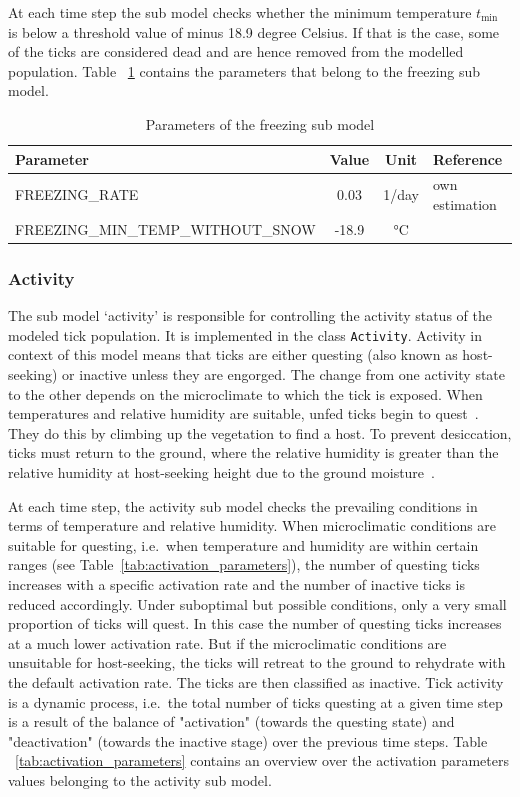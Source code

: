 \documentclass[a4paper, 11pt]{scrartcl}
\newcommand{\inlinecode}[1]{\texttt{\small #1}}
\begin{document}
At each time step the sub model checks whether the minimum temperature $t_{\min}$ is below a threshold value of minus 18.9 degree Celsius. If that is the case, some of the ticks are considered dead and are hence removed from the modelled population. Table ~\ref{tab:freezing_parameters} contains the parameters that belong to the freezing sub model.

\begin{table}[h!]
\caption{Parameters of the freezing sub model}
\label{tab:freezing_parameters}
\begin{tabularx}{\textwidth}{lccl}
\toprule
\textbf{Parameter}								& \textbf{Value} & \textbf{Unit}	& \textbf{Reference}  		\\
\midrule
\small{FREEZING\_RATE}		    			 	&   0.03    	& 1/day & own estimation 	\\
\small{FREEZING\_MIN\_TEMP\_WITHOUT\_SNOW}	   	&   -18.9    	& °C &  ~\cite{Gray.2009}	\\
\bottomrule
\end{tabularx}
\end{table}

\subsubsection{Activity}
The sub model `activity' is responsible for controlling the activity status of the modeled tick population. It is implemented in the class \inlinecode{Activity}. Activity in context of this model means that ticks are either questing (also known as host-seeking) or inactive unless they are engorged. The change from one activity state to the other depends on the microclimate to which the tick is exposed. When temperatures and relative humidity are suitable, unfed ticks begin to quest~\parencite{Perret.2000}. They do this by climbing up the vegetation to find a host. To prevent desiccation, ticks must return to the ground, where the relative humidity is greater than the relative humidity at host-seeking height due to the ground moisture~\parencite{Randolph.2004}.

At each time step, the activity sub model checks the prevailing conditions in terms of temperature and relative humidity. When microclimatic conditions are suitable for questing, i.e.\ when temperature and humidity are within certain ranges (see Table~\ref{tab:activation_parameters}), the number of questing ticks increases with a specific activation rate and the number of inactive ticks is reduced accordingly. Under suboptimal but possible conditions, only a very small proportion of ticks will quest. In this case the number of questing ticks increases at a much lower activation rate. But if the microclimatic conditions are unsuitable for host-seeking, the ticks will retreat to the ground to rehydrate with the default activation rate. The ticks are then classified as inactive. Tick activity is a dynamic process, i.e.\ the total number of ticks questing at a given time step is a result of the balance of "activation" (towards the questing state) and "deactivation" (towards the inactive stage) over the previous time steps. Table ~\ref{tab:activation_parameters} contains an overview over the activation parameters values belonging to the activity sub model.
\end{document}
